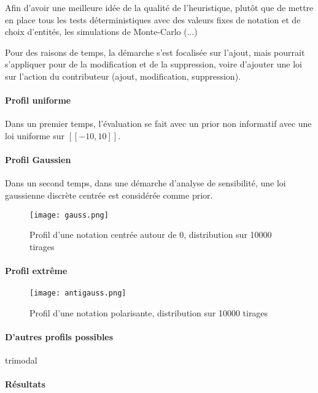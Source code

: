 Afin d'avoir une meilleure idée de la qualité de l'heuristique, plutôt que de mettre en place tous les tests déterministiques avec des valeurs fixes de notation et de choix d'entités, les simulations de Monte-Carlo (...)

Pour des raisons de temps, la démarche s'est focalisée sur l'ajout, mais pourrait s'appliquer pour de la modification et de la suppression, voire d'ajouter une loi sur l'action du contributeur (ajout, modification, suppression). 

\paragraph{Profil uniforme}

Dans un premier temps, l'évaluation se fait avec un prior non informatif avec une loi uniforme sur $[\![-10,10]\!]$.

\paragraph{Profil Gaussien}

Dans un second temps, dans une démarche d'analyse de sensibilité, une loi gaussienne discrète centrée est considérée comme prior.

\begin{figure}[ht]
  \texttt{[image: gauss.png]}
  \caption{Profil d'une notation centrée autour de 0, distribution sur 10000 tirages}
\end{figure}



\paragraph{Profil extrême}


\begin{figure}[ht]
  \texttt{[image: antigauss.png]}
  \caption{Profil d'une notation polarisante, distribution sur 10000 tirages}
\end{figure}

\paragraph{D'autres profils possibles}

trimodal

\paragraph{Résultats}

